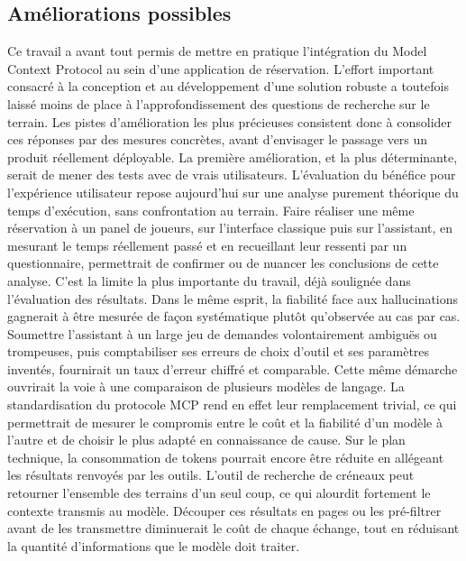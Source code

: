 \documentclass[12pt]{article}
\begin{document}
\subsection{Améliorations possibles}
Ce travail a avant tout permis de mettre en pratique l'intégration du Model Context Protocol au sein d'une application de réservation. L'effort important consacré à la conception et au développement d'une solution robuste a toutefois laissé moins de place à l'approfondissement des questions de recherche sur le terrain. Les pistes d'amélioration les plus précieuses consistent donc à consolider ces réponses par des mesures concrètes, avant d'envisager le passage vers un produit réellement déployable.
\newline\newline
La première amélioration, et la plus déterminante, serait de mener des tests avec de vrais utilisateurs. L'évaluation du bénéfice pour l'expérience utilisateur repose aujourd'hui sur une analyse purement théorique du temps d'exécution, sans confrontation au terrain. Faire réaliser une même réservation à un panel de joueurs, sur l'interface classique puis sur l'assistant, en mesurant le temps réellement passé et en recueillant leur ressenti par un questionnaire, permettrait de confirmer ou de nuancer les conclusions de cette analyse. C'est la limite la plus importante du travail, déjà soulignée dans l'évaluation des résultats.
\newline\newline
Dans le même esprit, la fiabilité face aux hallucinations gagnerait à être mesurée de façon systématique plutôt qu'observée au cas par cas. Soumettre l'assistant à un large jeu de demandes volontairement ambiguës ou trompeuses, puis comptabiliser ses erreurs de choix d'outil et ses paramètres inventés, fournirait un taux d'erreur chiffré et comparable. Cette même démarche ouvrirait la voie à une comparaison de plusieurs modèles de langage. La standardisation du protocole MCP rend en effet leur remplacement trivial, ce qui permettrait de mesurer le compromis entre le coût et la fiabilité d'un modèle à l'autre et de choisir le plus adapté en connaissance de cause.
\newline\newline
Sur le plan technique, la consommation de tokens pourrait encore être réduite en allégeant les résultats renvoyés par les outils. L'outil de recherche de créneaux peut retourner l'ensemble des terrains d'un seul coup, ce qui alourdit fortement le contexte transmis au modèle. Découper ces résultats en pages ou les pré-filtrer avant de les transmettre diminuerait le coût de chaque échange, tout en réduisant la quantité d'informations que le modèle doit traiter.
\end{document}
